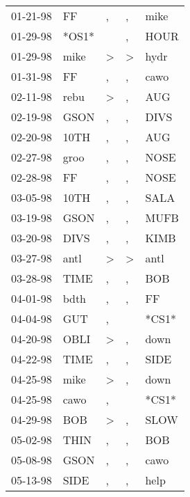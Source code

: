 \begin{supertabular}{lllll}
 01-21-98 &     FF &                , &                , &   mike \\
 01-29-98 &  *OS1* &                  &                , &   HOUR \\
 01-29-98 &   mike &     \textgreater &     \textgreater &   hydr \\
 01-31-98 &     FF &                , &                , &   cawo \\
 02-11-98 &   rebu &     \textgreater &                , &    AUG \\
 02-19-98 &   GSON &                , &                , &   DIVS \\
 02-20-98 &   10TH &                , &                , &    AUG \\
 02-27-98 &   groo &                , &                , &   NOSE \\
 02-28-98 &     FF &                , &                , &   NOSE \\
 03-05-98 &   10TH &                , &                , &   SALA \\
 03-19-98 &   GSON &                , &                , &   MUFB \\
 03-20-98 &   DIVS &                , &                , &   KIMB \\
 03-27-98 &   antl &     \textgreater &     \textgreater &   antl \\
 03-28-98 &   TIME &                , &                , &    BOB \\
 04-01-98 &   bdth &                , &                , &     FF \\
 04-04-98 &    GUT &                , &                  &  *CS1* \\
 04-20-98 &   OBLI &     \textgreater &                , &   down \\
 04-22-98 &   TIME &                , &                , &   SIDE \\
 04-25-98 &   mike &     \textgreater &                , &   down \\
 04-25-98 &   cawo &                , &                  &  *CS1* \\
 04-29-98 &    BOB &     \textgreater &                , &   SLOW \\
 05-02-98 &   THIN &                , &                , &    BOB \\
 05-08-98 &   GSON &                , &                , &   cawo \\
 05-13-98 &   SIDE &                , &                , &   help \\

\end{supertabular}
